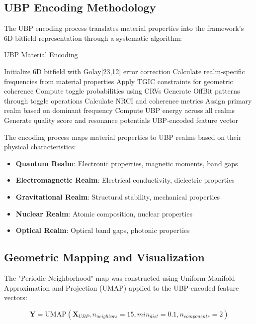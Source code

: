 \documentclass[12pt,a4paper]{article}
\begin{document}
\subsection{UBP Encoding Methodology}

The UBP encoding process translates material properties into the framework's 6D bitfield representation through a systematic algorithm:

\begin{algorithm}
\caption{UBP Material Encoding}
\begin{algorithmic}[1]
\STATE Initialize 6D bitfield with Golay[23,12] error correction
\STATE Calculate realm-specific frequencies from material properties
\STATE Apply TGIC constraints for geometric coherence
\STATE Compute toggle probabilities using CRVs
\STATE Generate OffBit patterns through toggle operations
\STATE Calculate NRCI and coherence metrics
\STATE Assign primary realm based on dominant frequency
\STATE Compute UBP energy across all realms
\STATE Generate quality score and resonance potentials
\RETURN UBP-encoded feature vector
\end{algorithmic}
\end{algorithm}

The encoding process maps material properties to UBP realms based on their physical characteristics:
\begin{itemize}
    \item \textbf{Quantum Realm}: Electronic properties, magnetic moments, band gaps
    \item \textbf{Electromagnetic Realm}: Electrical conductivity, dielectric properties
    \item \textbf{Gravitational Realm}: Structural stability, mechanical properties
    \item \textbf{Nuclear Realm}: Atomic composition, nuclear properties
    \item \textbf{Optical Realm}: Optical band gaps, photonic properties
\end{itemize}

\subsection{Geometric Mapping and Visualization}

The "Periodic Neighborhood" map was constructed using Uniform Manifold Approximation and Projection (UMAP) \cite{mcinnes2018umap} applied to the UBP-encoded feature vectors:

\begin{equation}
\mathbf{Y} = \text{UMAP}(\mathbf{X}_{UBP}, n_{neighbors}=15, min_{dist}=0.1, n_{components}=2)
\end{equation}
\end{document}
